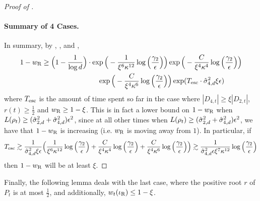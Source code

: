 \begin{proof}[Proof of ]
\paragraph{Summary of 4 Cases.} In summary, by , ,  and ,
\begin{align}
1 - {w_{\textup{R}}}
& \geq 
\Big(1 - \frac{1}{\log d}\Big) \cdot \exp\Big(-\frac{1}{\xi^6 \kappa^{12}} \log\Big(\frac{\gamma_2}{\epsilon}\Big)\Big)
\exp\Big(-\frac{C}{\xi^4 \kappa^4} \log\Big(\frac{\gamma_2}{\epsilon}\Big)\Big) \\
& \,\,\,\,\,\,\,\,\,\,\,\,\,\,\,\,\,\,\,\,\,\,\,\,\,\,\,\,\,\,\,\,\,\,\,\,\,\,\,\,\,\,\,\,\,\,\,\, \exp\Big(-\frac{C}{\xi^4 \kappa^6} \log\Big(\frac{\gamma_2}{\epsilon}\Big)\Big) 
\exp({T_{\textup{esc}}} \cdot \hat{\sigma}_{4, d}^2 \xi \epsilon)
\end{align}
where ${T_{\textup{esc}}}$ is the amount of time spent so far in the case where $|D_{4, t}| \geq \xi |D_{2, t}|$, $r(t) \geq \frac{1}{2}$ and ${w_{\textup{R}}} \geq 1 - \xi$. This is in fact a lower bound on $1 - {w_{\textup{R}}}$ when $L(\rho_t) \geq (\hat{\sigma}_{2, d}^2 + \hat{\sigma}_{4, d}^2) \epsilon^2$, since at all other times when $L(\rho_t) \geq (\hat{\sigma}_{2, d}^2 + \hat{\sigma}_{4, d}^2)\epsilon^2$, we have that $1 - {w_{\textup{R}}}$ is increasing (i.e. ${w_{\textup{R}}}$ is moving away from $1$). In particular, if
\begin{align}
{T_{\textup{esc}}}
\gtrsim \frac{1}{\hat{\sigma}_{4, d}^2 \xi \epsilon} \Big(\frac{1}{\xi^6 \kappa^{12}} \log\Big(\frac{\gamma_2}{\epsilon}\Big) + \frac{C}{\xi^4 \kappa^4} \log\Big(\frac{\gamma_2}{\epsilon}\Big) + \frac{C}{\xi^4 \kappa^6} \log\Big(\frac{\gamma_2}{\epsilon}\Big) \Big) 
\gtrsim \frac{1}{\hat{\sigma}_{4, d}^2 \epsilon \xi^7 \kappa^{12}} \log\Big(\frac{\gamma_2}{\epsilon}\Big)
\end{align}
then $1 - {w_{\textup{R}}}$ will be at least $\xi$.
\end{proof}

Finally, the following lemma deals with the last case, where the positive root $r$ of $P_t$ is at most $\frac{1}{2}$, and additionally, $w_t(\iota_{\textup{R}}) \leq 1 - \xi$.

